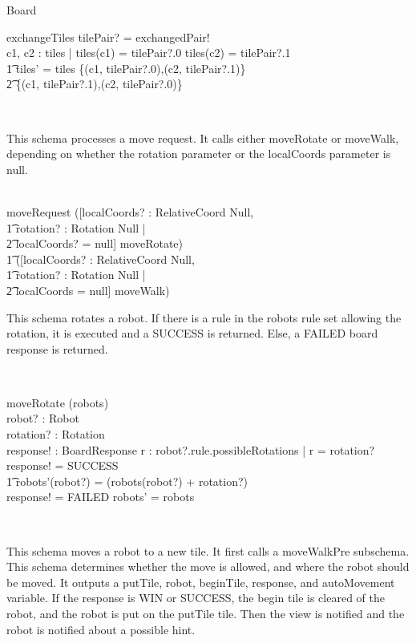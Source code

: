 \begin{class}{Board}
\begin{schema}{exchangeTiles}
\where
tilePair? = exchangedPair! \\
\also \also \also
\exists c1, c2 : \dom tiles | tiles(c1) = tilePair?.0 \wedge tiles(c2) = tilePair?.1 \; \; \wedge \\ \t1
tiles' = tiles \setminus \{(c1, tilePair?.0),(c2, tilePair?.1)\} \cup \\ \t2 \{(c1, tilePair?.1),(c2, tilePair?.0)\}
\end{schema} \\
\begin{zpar}
This schema processes a move request. It calls either moveRotate or moveWalk, depending on whether the rotation parameter or the localCoords parameter is null.
\end{zpar} \\
moveRequest \sdef ([localCoords? : RelativeCoord \cup Null, \\ \t1 rotation? : Rotation \cup Null | \\ \t2 localCoords? = null] \wedge moveRotate) \; \; [] \\ \t1
([localCoords? : RelativeCoord \cup Null, \\ \t1 rotation? : Rotation \cup Null | \\ \t2 localCoords = null] \wedge moveWalk) \\
\begin{zpar}
This schema rotates a robot. If there is a rule in the robots rule set allowing the rotation, it is executed and a SUCCESS is returned. Else, a FAILED board response is returned.
\end{zpar} \\
\begin{schema}{moveRotate}
\Delta(robots) \\
robot? : Robot \\
rotation? : Rotation \\
response! : BoardResponse
\where
\IF \exists r : robot?.rule.possibleRotations | r = rotation?\\
\THEN response! = SUCCESS \; \; \wedge \\ \t1
robots'(robot?) = (robots(robot?) + rotation?)  \\
\ELSE response! = FAILED \wedge robots' = robots
\end{schema} \\
\znewpage
\begin{zpar}
This schema moves a robot to a new tile. It first calls a moveWalkPre subschema. This schema determines whether the move is allowed, and where the robot should be moved. It outputs a putTile, robot, beginTile, response, and autoMovement variable. If the response is WIN or SUCCESS, the begin tile is cleared of the robot, and the robot is put on the putTile tile. Then the view is notified and the robot is notified about a possible hint.

\end{zpar}
\end{class}
